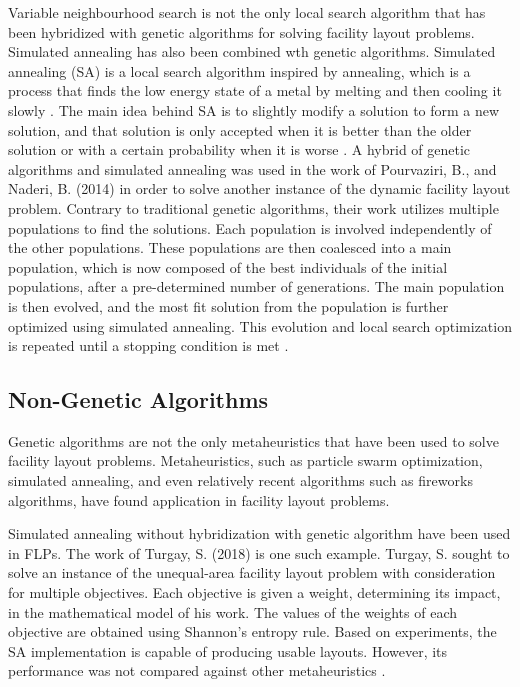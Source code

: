 Variable neighbourhood search is not the only local search algorithm that has been hybridized with genetic algorithms for solving facility layout problems. Simulated annealing has also been combined wth genetic algorithms. Simulated annealing (SA) is a local search algorithm inspired by annealing, which is a process that finds the low energy state of a metal by melting and then cooling it slowly \cite{Lai1997}. The main idea behind SA is to slightly modify a solution to form a new solution, and that solution is only accepted when it is better than the older solution or with a certain probability when it is worse \cite{Dueck1993}. A hybrid of genetic algorithms and simulated annealing was used in the work of Pourvaziri, B., and Naderi, B. (2014) in order to solve another instance of the dynamic facility layout problem. Contrary to traditional genetic algorithms, their work utilizes multiple populations to find the solutions. Each population is involved independently of the other populations. These populations are then coalesced into a main population, which is now composed of the best individuals of the initial populations, after a pre-determined number of generations. The main population is then evolved, and the most fit solution from the population is further optimized using simulated annealing. This evolution and local search optimization is repeated until a stopping condition is met \cite{Pourvaziri2014}. 

\subsection{Non-Genetic Algorithms}
Genetic algorithms are not the only metaheuristics that have been used to solve facility layout problems. Metaheuristics, such as particle swarm optimization, simulated annealing, and even relatively recent algorithms such as fireworks algorithms, have found application in facility layout problems.

Simulated annealing without hybridization with genetic algorithm have been used in FLPs. The work of Turgay, S. (2018) is one such example. Turgay, S. sought to solve an instance of the unequal-area facility layout problem with consideration for multiple objectives. Each objective is given a weight, determining its impact, in the mathematical model of his work. The values of the weights of each objective are obtained using Shannon's entropy rule. Based on experiments, the SA implementation is capable of producing usable layouts. However, its performance was not compared against other metaheuristics \cite{Turgay2018}.
